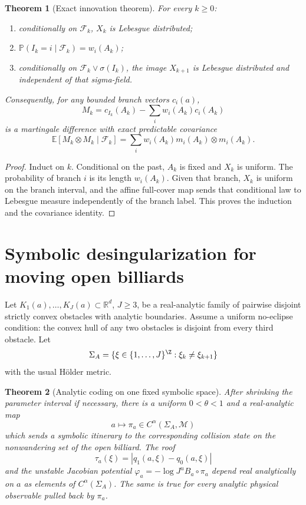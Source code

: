 \documentclass[11pt,reqno]{amsart}
\newtheorem{theorem}{Theorem}[section]
\theoremstyle{definition}
\theoremstyle{remark}
\newcommand{\E}{\mathbb E}
\newcommand{\R}{\mathbb R}
\newcommand{\F}{\mathcal F}
\newcommand{\abs}[1]{\left\lvert #1\right\rvert}
\begin{document}
\begin{theorem}[Exact innovation theorem]\label{thm:innovations}
For every $k\ge0$:
\begin{enumerate}[label=(\roman*)]
\item conditionally on $\F_k$, $X_k$ is Lebesgue distributed;
\item $\mathbb P(I_k=i\mid\F_k)=w_i(A_k)$;
\item conditionally on $\F_k\vee\sigma(I_k)$, the image $X_{k+1}$ is
Lebesgue distributed and independent of that sigma-field.
\end{enumerate}
Consequently, for any bounded branch vectors $c_i(a)$,
\[
 M_k=c_{I_k}(A_k)-\sum_iw_i(A_k)c_i(A_k)
\]
is a martingale difference with exact predictable covariance
\[
 \E[M_k\otimes M_k\mid\F_k]
 =\sum_iw_i(A_k)m_i(A_k)\otimes m_i(A_k).
\]
\end{theorem}

\begin{proof}
Induct on $k$.  Conditional on the past, $A_k$ is fixed and $X_k$ is uniform.
The probability of branch $i$ is its length $w_i(A_k)$.  Given that branch,
$X_k$ is uniform on the branch interval, and the affine full-cover map sends
that conditional law to Lebesgue measure independently of the branch label.
This proves the induction and the covariance identity.
\end{proof}

\section{Symbolic desingularization for moving open billiards}

Let $K_1(a),\ldots,K_J(a)\subset\R^d$, $J\ge3$, be a real-analytic family of
pairwise disjoint strictly convex obstacles with analytic boundaries.  Assume
a uniform no-eclipse condition: the convex hull of any two obstacles is
disjoint from every third obstacle.  Let
\[
 \Sigma_A=\{\xi\in\{1,\ldots,J\}^{\Z}:\xi_k\ne\xi_{k+1}\}
\]
with the usual Hölder metric.

\begin{theorem}[Analytic coding on one fixed symbolic space]\label{thm:symbolic}
After shrinking the parameter interval if necessary, there is a uniform
$0<\theta<1$ and a real-analytic map
\[
 a\longmapsto\pi_a\in C^\alpha(\Sigma_A,\mathcal M)
\]
which sends a symbolic itinerary to the corresponding collision state on the
nonwandering set of the open billiard.  The roof
\[
 \tau_a(\xi)=\abs{q_1(a,\xi)-q_0(a,\xi)}
\]
and the unstable Jacobian potential
$\varphi_a=-\log J^uB_a\circ\pi_a$ depend real analytically on $a$ as elements
of $C^\alpha(\Sigma_A)$.  The same is true for every analytic physical
observable pulled back by $\pi_a$.
\end{theorem}
\end{document}
